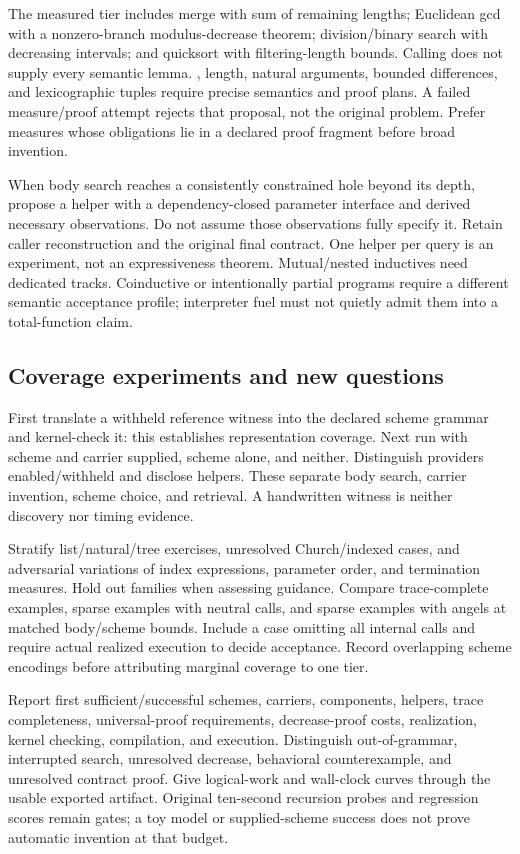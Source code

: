 The measured tier includes merge with sum of remaining lengths; Euclidean gcd
with a nonzero-branch modulus-decrease theorem; division/binary search with
decreasing intervals; and quicksort with filtering-length bounds. Calling
 does not supply every semantic lemma. , length,
natural arguments, bounded differences, and lexicographic tuples require
precise semantics and proof plans. A failed measure/proof attempt rejects
that proposal, not the original problem. Prefer measures whose obligations
lie in a declared proof fragment before broad invention.

When body search reaches a consistently constrained hole beyond its depth,
propose a helper with a dependency-closed parameter interface and derived
necessary observations. Do not assume those observations fully specify it.
Retain caller reconstruction and the original final contract. One helper per
query is an experiment, not an expressiveness theorem. Mutual/nested inductives
need dedicated tracks. Coinductive or intentionally partial programs require
a different semantic acceptance profile; interpreter fuel must not quietly
admit them into a total-function claim.

\subsection{Coverage experiments and new questions}\label{sec:recursion-evaluation}

First translate a withheld reference witness into the declared scheme grammar
and kernel-check it: this establishes representation coverage. Next run with
scheme and carrier supplied, scheme alone, and neither. Distinguish providers
enabled/withheld and disclose helpers. These separate body search, carrier
invention, scheme choice, and retrieval. A handwritten witness is neither
discovery nor timing evidence.

Stratify list/natural/tree exercises, unresolved Church/indexed cases, and
adversarial variations of index expressions, parameter order, and termination
measures. Hold out families when assessing guidance. Compare trace-complete
examples, sparse examples with neutral calls, and sparse examples with angels
at matched body/scheme bounds. Include a case omitting all internal calls and
require actual realized execution to decide acceptance. Record overlapping
scheme encodings before attributing marginal coverage to one tier.

Report first sufficient/successful schemes, carriers, components, helpers,
trace completeness, universal-proof requirements, decrease-proof costs,
realization, kernel checking, compilation, and execution. Distinguish
out-of-grammar, interrupted search, unresolved decrease, behavioral counterexample,
and unresolved contract proof. Give logical-work and wall-clock curves through
the usable exported artifact. Original ten-second recursion probes and
regression scores remain gates; a toy model or supplied-scheme success does
not prove automatic invention at that budget.

